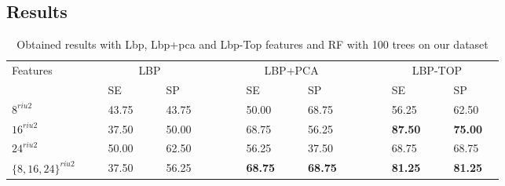 
\subsection{Results}


\begin{table}
\caption{Obtained results with Lbp, Lbp+pca and Lbp-Top features and RF with 100 trees on our dataset}
\centering
\begin{tabular}{lcclcclcccclcclcccclcclc}
\toprule
Features 	& & &\multicolumn{4}{c}{LBP}&	 & & & &\multicolumn{4}{c}{LBP+PCA}& & & & &\multicolumn{4}{c}{LBP-TOP} &\\
  \cmidrule(l){2-8}  \cmidrule(l){10-16}  \cmidrule(l){18-24}
	       & & & SE & & & SP & & & & & SE & & & SP & & & & & SE & & & SP & \\
\midrule
 $8^{riu2}$ 						& & & 43.75 & & & 43.75 & & & & & 50.00 & & & 68.75 & & & & & 56.25 & & & 62.50 & \\	
 $16^{riu2}$						& & & 37.50 & & & 50.00 & & & & & 68.75 & & & 56.25 & & & & & \textbf{87.50} & & & \textbf{75.00} & \\	
 $24^{riu2}$						& & & 50.00 & & & 62.50 & & & & & 56.25 & & & 37.50 & & & & & 68.75 & & & 68.75 & \\
 $\lbrace 8,16,24\rbrace^{riu2}$	& & & 37.50 & & & 56.25 & & & & & \textbf{68.75} & & & \textbf{68.75} & & & & & \textbf{81.25} & & & \textbf{81.25} & \\
\bottomrule
\end{tabular}
\label{tab:LbPTopVolumeResult}
\end{table}


